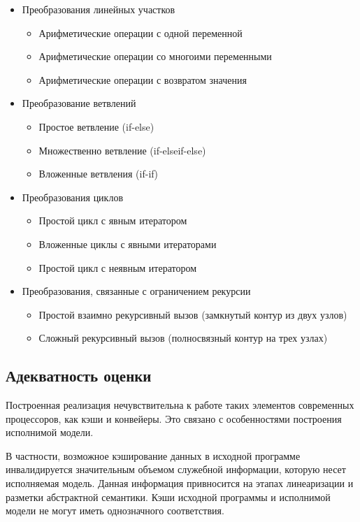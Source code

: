 \documentclass[12pt,a4paper]{article}
\begin{document}
\begin{itemize}
    \item Преобразования линейных участков
    \begin{itemize}
        \item Арифметические операции с одной переменной
        \item Арифметические операции со многоими переменными
        \item Арифметические операции с возвратом значения
    \end{itemize}
    \item Преобразование ветвлений
    \begin{itemize}
        \item Простое ветвление (if-else)
        \item Множественно ветвление (if-elseif-else)
        \item Вложенные ветвления (if-if)
    \end{itemize}
    \item Преобразования циклов
    \begin{itemize}
        \item Простой цикл с явным итератором
        \item Вложенные циклы с явными итераторами
        \item Простой цикл с неявным итератором
    \end{itemize}
    \item Преобразования, связанные с ограничением рекурсии
    \begin{itemize}
        \item Простой взаимно рекурсивный вызов (замкнутый контур из двух узлов)
        \item Сложный рекурсивный вызов (полносвязный контур на трех узлах)
    \end{itemize}
\end{itemize}

\subsection{Адекватность оценки}

Построенная реализация нечувствительна к работе таких элементов современных процессоров, как кэши и конвейеры. Это связано с особенностями построения исполнимой модели.

В частности, возможное кэширование данных в исходной программе инвалидируется значительным объемом служебной информации, которую несет исполняемая модель. Данная информация привносится на этапах линеаризации и разметки абстрактной семантики. Кэши исходной программы и исполнимой модели не могут иметь однозначного соответствия.
\end{document}
